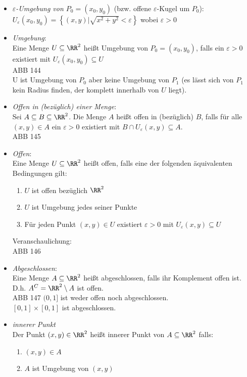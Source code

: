 \begin{itemize}
\item \emph{$\varepsilon$-Umgebung von $P_0=(x_0, y_0)$} (bzw. offene $\varepsilon$-Kugel um $P_0$):\\
$U_\varepsilon (x_0, y_0) =\left\lbrace (x,y)| \sqrt{x^2+y^2}<\varepsilon\right\rbrace$ wobei $\varepsilon>0$
\item \emph{Umgebung}: \\
Eine Menge $U \subseteq \RR^2$ heißt Umgebung von $P_0=(x_0,y_0)$, falls ein $\varepsilon>0$ existiert mit $U_\varepsilon(x_0,y_0) \subseteq U$\\
ABB 144\\
U ist Umgebung von $P_0$ aber keine Umgebung von $P_1$ (es lässt sich von $P_1$ kein Radius finden, der komplett innerhalb von $U$ liegt).
\item \emph{Offen in (bezüglich) einer Menge}:\\
Sei $A\subseteq B \subseteq \RR^2$. Die Menge $A$ heißt offen in (bezüglich) $B$, falls für alle $(x,y) \in A$ ein $\varepsilon>0$ existiert mit $B \cap U_\varepsilon (x,y) \subseteq A$.\\
ABB 145
\item \emph{Offen}:\\
Eine Menge $U \subseteq \RR^2$ heißt offen, falls eine der folgenden äquivalenten Bedingungen gilt:
\begin{enumerate}
\item $U$ ist offen bezüglich $\RR^2$
\item $U$ ist Umgebung jedes seiner Punkte
\item Für jeden Punkt $(x,y) \in U$ existiert $\varepsilon > 0$ mit $U_\varepsilon (x,y) \subseteq U$
\end{enumerate}
Veranschaulichung: \\
ABB 146
\item \emph{Abgeschlossen}:\\
Eine Menge $A \subseteq \RR^2$ heißt abgeschlossen, falls ihr Komplement offen ist. D.h. $A^C=\RR^2\setminus A$ ist offen.\\
ABB 147 $(0,1]$ ist weder offen noch abgeschlossen.\\
$[0,1]\times[0,1]$ ist abgeschlossen.
\item \emph{innerer Punkt}\\
Der Punkt $(x,y)\in \RR^2$ heißt innerer Punkt von $A \subseteq \RR^2$ falls:
\begin{enumerate}
\item $(x,y) \in A$
\item $A$ ist Umgebung von $(x,y)$

\end{enumerate}
\end{itemize}
